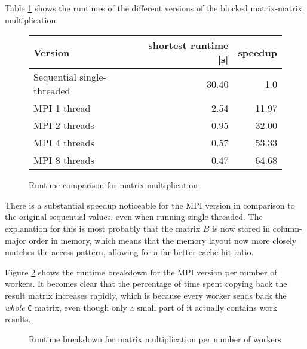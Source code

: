 \documentclass[]{article}
\begin{document}
 Table \ref{tab:matrix-mult-runtime} shows the runtimes of the different versions of the blocked matrix-matrix multiplication.

\begin{figure}[h]
	\centering
	\begin{tabular}{|l|r|r|}
		\hline
		\textbf{Version} & \textbf{shortest runtime [s]} & \textbf{speedup} \\
		\hline
		Sequential single-threaded	& 30.40	& 1.0 \\ 
		\hline 
		MPI 1 thread				& 2.54	& 11.97 \\ 
		\hline 
		MPI 2 threads				& 0.95	& 32.00 \\ 
		\hline 
		MPI 4 threads				& 0.57	& 53.33 \\ 
		\hline 
		MPI 8 threads				& 0.47	& 64.68 \\ 
		\hline 
	\end{tabular} 
	\caption{Runtime comparison for matrix multiplication}
	\label{tab:matrix-mult-runtime}
\end{figure}

There is a substantial speedup noticeable for the MPI version in comparison to the original sequential values, even when running single-threaded. The explanation for this is most probably that the matrix $B$ is now stored in column-major order in memory, which means that the memory layout now more closely matches the access pattern, allowing for a far better cache-hit ratio.

Figure \ref{fig:maxtrix-mult-chart} shows the runtime breakdown for the MPI version per number of workers. It becomes clear that the percentage of time spent copying back the result matrix increases rapidly, which is because every worker sends back the \emph{whole} \texttt{C} matrix, even though only a small part of it actually contains work results.

\begin{figure}[h]
	\centering
	\caption{Runtime breakdown for matrix multiplication per number of workers}
	\label{fig:maxtrix-mult-chart}
\end{figure}
\end{document}
